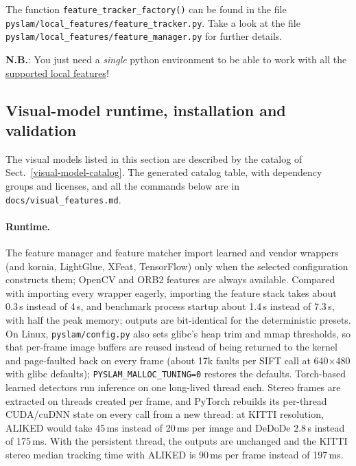 \documentclass{article}
\let\oldparagraph\paragraph
\renewcommand{\paragraph}[1]{\oldparagraph{#1}\mbox{}}
\begin{document}
The function \texttt{feature\_tracker\_factory()} can be found in the
file \texttt{pyslam/local\_features/feature\_tracker.py}. Take a look at the
file \texttt{pyslam/local\_features/feature\_manager.py} for further details.

\textbf{N.B.}: You just need a \emph{single} python environment to be
able to work with all the
\protect\hyperlink{supported-local-features}{supported local features}!

\subsection{Visual-model runtime, installation and validation}\label{visual-model-runtime}

The visual models listed in this section are described by the catalog of Sect.~\ref{visual-model-catalog}. The generated catalog table, with dependency groups and licenses, and all the commands below are in \texttt{docs/visual\_features.md}.

\paragraph{Runtime.} The feature manager and feature matcher import learned and vendor wrappers (and kornia, LightGlue, XFeat, TensorFlow) only when the selected configuration constructs them; OpenCV and ORB2 features are always available. Compared with importing every wrapper eagerly, importing the feature stack takes about 0.3\,s instead of 4\,s, and benchmark process startup about 1.4\,s instead of 7.3\,s, with half the peak memory; outputs are bit-identical for the deterministic presets. On Linux, \texttt{pyslam/config.py} also sets glibc's heap trim and mmap thresholds, so that per-frame image buffers are reused instead of being returned to the kernel and page-faulted back on every frame (about 17k faults per SIFT call at 640$\times$480 with glibc defaults); \texttt{PYSLAM\_MALLOC\_TUNING=0} restores the defaults. Torch-based learned detectors run inference on one long-lived thread each. Stereo frames are extracted on threads created per frame, and PyTorch rebuilds its per-thread CUDA/cuDNN state on every call from a new thread: at KITTI resolution, ALIKED would take 45\,ms instead of 20\,ms per image and DeDoDe 2.8\,s instead of 175\,ms. With the persistent thread, the outputs are unchanged and the KITTI stereo median tracking time with ALIKED is 90\,ms per frame instead of 197\,ms.
\end{document}
